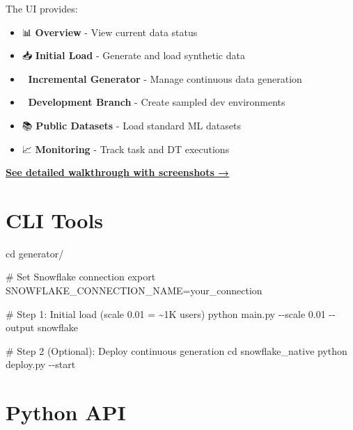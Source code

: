 \documentclass[
  letterpaper,
  DIV=11,
  numbers=noendperiod]{scrreprt}
\newenvironment{Shaded}{\begin{snugshade}}{\end{snugshade}}
\newcommand{\AttributeTok}[1]{\textcolor[rgb]{0.40,0.45,0.13}{#1}}
\newcommand{\BuiltInTok}[1]{\textcolor[rgb]{0.00,0.23,0.31}{#1}}
\newcommand{\CommentTok}[1]{\textcolor[rgb]{0.37,0.37,0.37}{#1}}
\newcommand{\ExtensionTok}[1]{\textcolor[rgb]{0.00,0.23,0.31}{#1}}
\newcommand{\NormalTok}[1]{\textcolor[rgb]{0.00,0.23,0.31}{#1}}
\newcommand{\OperatorTok}[1]{\textcolor[rgb]{0.37,0.37,0.37}{#1}}
\newcommand{\VariableTok}[1]{\textcolor[rgb]{0.07,0.07,0.07}{#1}}
\providecommand{\tightlist}{%
  \setlength{\itemsep}{0pt}\setlength{\parskip}{0pt}}\usepackage{longtable,booktabs,array}
\begin{document}
The UI provides:

\begin{itemize}
\tightlist
\item
  📊 \textbf{Overview} - View current data status
\item
  📥 \textbf{Initial Load} - Generate and load synthetic data\\
\item
  🔄 \textbf{Incremental Generator} - Manage continuous data generation
\item
  🌿 \textbf{Development Branch} - Create sampled dev environments
\item
  📚 \textbf{Public Datasets} - Load standard ML datasets
\item
  📈 \textbf{Monitoring} - Track task and DT executions
\end{itemize}

\textbf{\protect\hyperlink{streamlit-data-manager}{See detailed
walkthrough with screenshots →}}

\section{CLI Tools}

\begin{Shaded}
\begin{Highlighting}[]
\BuiltInTok{cd}\NormalTok{ generator/}

\CommentTok{\# Set Snowflake connection}
\BuiltInTok{export} \VariableTok{SNOWFLAKE\_CONNECTION\_NAME}\OperatorTok{=}\NormalTok{your\_connection}

\CommentTok{\# Step 1: Initial load (scale 0.01 = \textasciitilde{}1K users)}
\ExtensionTok{python}\NormalTok{ main.py }\AttributeTok{{-}{-}scale}\NormalTok{ 0.01 }\AttributeTok{{-}{-}output}\NormalTok{ snowflake}

\CommentTok{\# Step 2 (Optional): Deploy continuous generation}
\BuiltInTok{cd}\NormalTok{ snowflake\_native}
\ExtensionTok{python}\NormalTok{ deploy.py }\AttributeTok{{-}{-}start}
\end{Highlighting}
\end{Shaded}

\section{Python API}
\end{document}
